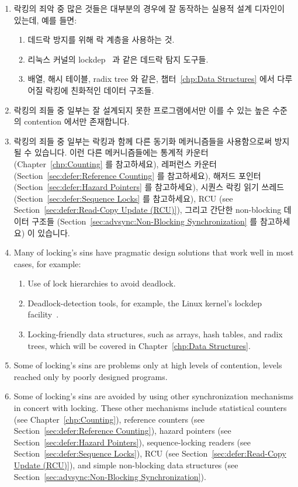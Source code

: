 \begin{enumerate}
\item	락킹의 죄악 중 많은 것들은 대부분의 경우에 잘 동작하는 실용적 설계
	디자인이 있는데, 예를 들면:
	\begin{enumerate}
	\item	데드락 방지를 위해 락 계층을 사용하는 것.
	\item	리눅스 커널의 lockdep~\cite{JonathanCorbet2006lockdep} 과 같은
		데드락 탐지 도구들.
	\item	배열, 해시 테이블, radix tree 와 같은,
		챕터~\ref{chp:Data Structures} 에서 다루어질 락킹에 친화적인
		데이터 구조들.
	\end{enumerate}
\item	락킹의 죄들 중 일부는 잘 설계되지 못한 프로그램에서만 이를 수 있는 높은
	수준의 contention 에서만 존재합니다.
\item	락킹의 죄들 중 일부는 락킹과 함께 다른 동기화 메커니즘들을 사용함으로써
	방지될 수 있습니다.
	이런 다른 메커니즘들에는 통계적 카운터
	(Chapter~\ref{chp:Counting} 를 참고하세요),
	레퍼런스 카운터
	(Section~\ref{sec:defer:Reference Counting} 를 참고하세요),
	해저드 포인터
	(Section~\ref{sec:defer:Hazard Pointers} 를 참고하세요),
	시퀀스 락킹 읽기 쓰레드
	(Section~\ref{sec:defer:Sequence Locks} 를 참고하세요),
	RCU
	(see Section~\ref{sec:defer:Read-Copy Update (RCU)}),
	그리고 간단한 non-blocking 데이터 구조들
	(Section~\ref{sec:advsync:Non-Blocking Synchronization} 를 참고하세요)
	이 있습니다.

\iffalse

\item	Many of locking's sins have pragmatic design solutions that
	work well in most cases, for example:
	\begin{enumerate}
	\item	Use of lock hierarchies to avoid deadlock.
	\item	Deadlock-detection tools, for example, the Linux kernel's
		lockdep facility~\cite{JonathanCorbet2006lockdep}.
	\item	Locking-friendly data structures, such as
		arrays, hash tables, and radix trees, which will
		be covered in Chapter~\ref{chp:Data Structures}.
	\end{enumerate}
\item	Some of locking's sins are problems only at high levels of
	contention, levels reached only by poorly designed programs.
\item	Some of locking's sins are avoided by using other synchronization
	mechanisms in concert with locking.
	These other mechanisms include
	statistical counters
	(see Chapter~\ref{chp:Counting}),
	reference counters
	(see Section~\ref{sec:defer:Reference Counting}),
	hazard pointers
	(see Section~\ref{sec:defer:Hazard Pointers}),
	sequence-locking readers
	(see Section~\ref{sec:defer:Sequence Locks}),
	RCU
	(see Section~\ref{sec:defer:Read-Copy Update (RCU)}),
	and simple non-blocking data structures
	(see Section~\ref{sec:advsync:Non-Blocking Synchronization}).


\end{enumerate}
